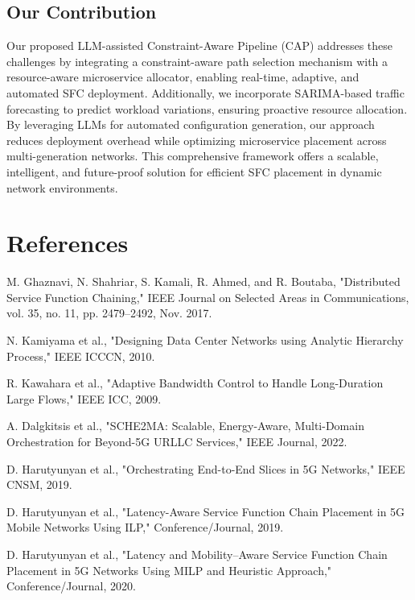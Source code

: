 \documentclass[conference]{IEEEtran}
\begin{document}
	\subsection{Our Contribution}
	Our proposed LLM-assisted Constraint-Aware Pipeline (CAP) addresses these challenges by integrating a constraint-aware path selection mechanism with a resource-aware microservice allocator, enabling real-time, adaptive, and automated SFC deployment. Additionally, we incorporate SARIMA-based traffic forecasting to predict workload variations, ensuring proactive resource allocation. By leveraging LLMs for automated configuration generation, our approach reduces deployment overhead while optimizing microservice placement across multi-generation networks. This comprehensive framework offers a scalable, intelligent, and future-proof solution for efficient SFC placement in dynamic network environments.
	
	\section{References}
	
	\begin{thebibliography}{99}
		
		M. Ghaznavi, N. Shahriar, S. Kamali, R. Ahmed, and R. Boutaba,  
		"Distributed Service Function Chaining,"  
		IEEE Journal on Selected Areas in Communications, vol. 35, no. 11, pp. 2479–2492, Nov. 2017.
		
		N. Kamiyama et al.,  
		"Designing Data Center Networks using Analytic Hierarchy Process,"  
		IEEE ICCCN, 2010.
		
		R. Kawahara et al.,  
		"Adaptive Bandwidth Control to Handle Long-Duration Large Flows,"  
		IEEE ICC, 2009.
		
		A. Dalgkitsis et al.,  
		"SCHE2MA: Scalable, Energy-Aware, Multi-Domain Orchestration for Beyond-5G URLLC Services,"  
		IEEE Journal, 2022.
		
		D. Harutyunyan et al.,  
		"Orchestrating End-to-End Slices in 5G Networks,"  
		IEEE CNSM, 2019.
		
		D. Harutyunyan et al.,  
		"Latency-Aware Service Function Chain Placement in 5G Mobile Networks Using ILP,"  
		Conference/Journal, 2019.
		
		D. Harutyunyan et al.,  
		"Latency and Mobility–Aware Service Function Chain Placement in 5G Networks Using MILP and Heuristic Approach,"  
		Conference/Journal, 2020.
		
	\end{thebibliography}
	
\end{document}
